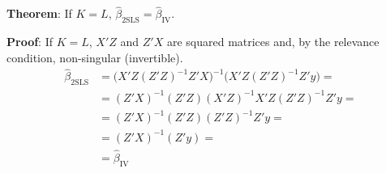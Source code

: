 \documentclass[12pt,]{book}
\begin{document}
\textbf{Theorem}:
If \(K=L\), \(\hat{\beta} _ {\text{2SLS}} = \hat{\beta} _ {\text{IV}}\).

\textbf{Proof}:
If \(K=L\), \(X'Z\) and \(Z'X\) are squared matrices and, by the relevance condition, non-singular (invertible).
\[
\begin{aligned}
    \hat{\beta} _ {\text{2SLS}} &= \Big( X'Z (Z'Z)^{-1} Z'X \Big)^{-1} \Big( X'Z (Z'Z)^{-1} Z'y \Big) = \\
    &= (Z'X)^{-1} (Z'Z) (X'Z)^{-1} X'Z (Z'Z)^{-1} Z'y = \\
    &= (Z'X)^{-1} (Z'Z) (Z'Z)^{-1} Z'y = \\
    &= (Z'X)^{-1} (Z'y) = \\
    &= \hat{\beta} _ {\text{IV}}
\end{aligned}
\]
\[\tag*{$\blacksquare$}\]
\end{document}
